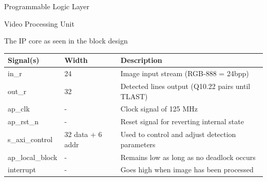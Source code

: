 \documentclass{matthijs}
\begin{document}
\begin{hoofdstuk}{Programmable Logic Layer}
\begin{paragraaf}{Video Processing Unit}
\begin{figuur}{The IP core as seen in the block design}
				{
				\small
				\begin{tabular}{l l l}
					\toprule
					Signal(s) & Width & Description \\
					\midrule
					in\_r & \qty{24}{\bit} & Image input stream (RGB-888 = 24bpp) \\
					out\_r & \qty{32}{\bit} & Detected lines output (Q10.22 pairs until TLAST) \\
					ap\_clk & - & Clock signal of 125 MHz \\
					ap\_rst\_n & - & Reset signal for reverting internal state \\
					s\_axi\_control & \qty{32}{\bit} data + \qty{6}{\bit} addr & Used to control and adjust detection parameters \\
					ap\_local\_block & - & Remains low as long as no deadlock occurs \\
					interrupt & - & Goes high when image has been processed \\
					\bottomrule
				\end{tabular}
				}
			\end{figuur}


\end{paragraaf}
\end{hoofdstuk}
\end{document}
